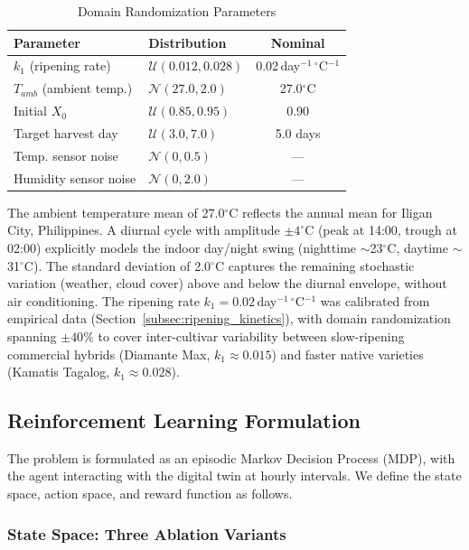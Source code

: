 \begin{table}[htbp]
\caption{Domain Randomization Parameters}
\label{tab:domain_rand}
\centering
\begin{tabular}{@{}llc@{}}
\toprule
\textbf{Parameter} & \textbf{Distribution} & \textbf{Nominal} \\
\midrule
$k_1$ (ripening rate) & $\mathcal{U}(0.012, 0.028)$ & 0.02\,day$^{-1}\,^\circ$C$^{-1}$ \\
$T_{amb}$ (ambient temp.) & $\mathcal{N}(27.0, 2.0)$ & 27.0$^\circ$C \\
Initial $X_0$ & $\mathcal{U}(0.85, 0.95)$ & 0.90 \\
Target harvest day & $\mathcal{U}(3.0, 7.0)$ & 5.0 days \\
Temp. sensor noise & $\mathcal{N}(0, 0.5)$ & --- \\
Humidity sensor noise & $\mathcal{N}(0, 2.0)$ & --- \\
\bottomrule
\end{tabular}
\end{table}

The ambient temperature mean of 27.0$^\circ$C reflects the annual mean for Iligan City, Philippines. A diurnal cycle with amplitude $\pm 4^\circ$C (peak at 14:00, trough at 02:00) explicitly models the indoor day/night swing (nighttime $\sim$23$^\circ$C, daytime $\sim$31$^\circ$C). The standard deviation of 2.0$^\circ$C captures the remaining stochastic variation (weather, cloud cover) above and below the diurnal envelope, without air conditioning. The ripening rate $k_1 = 0.02$\,day$^{-1}\,^\circ$C$^{-1}$ was calibrated from empirical data (Section~\ref{subsec:ripening_kinetics}), with domain randomization spanning $\pm 40\%$ to cover inter-cultivar variability between slow-ripening commercial hybrids (Diamante Max, $k_1 \approx 0.015$) and faster native varieties (Kamatis Tagalog, $k_1 \approx 0.028$).

\subsection{Reinforcement Learning Formulation}
The problem is formulated as an episodic Markov Decision Process (MDP), with the agent interacting with the digital twin at hourly intervals. We define the state space, action space, and reward function as follows.

\subsubsection{State Space: Three Ablation Variants}
\label{subsec:state_variants}

